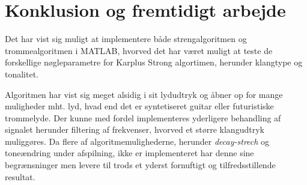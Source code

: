 \section{Konklusion og fremtidigt arbejde}
Det har vist sig muligt at implementere både strengalgoritmen og trommealgoritmen i MATLAB, hvorved det har været muligt at teste de forskellige nøgleparametre for Karplus Strong algortimen, herunder klangtype og tonalitet. 

Algoritmen har vist sig meget alsidig i sit lydudtryk og åbner op for mange muligheder mht. lyd, hvad end det er syntetiseret guitar eller futuristiske trommelyde. Der kunne med fordel implementeres yderligere behandling af signalet herunder filtering af frekvenser, hvorved et større klangudtryk muliggøres. Da flere af algoritmemulighederne, herunder \emph{decay-strech} og toneændring under afspilning, ikke er implementeret har denne sine begrænsninger men levere til trods et yderst fornuftigt og tilfredsstillende resultat.
